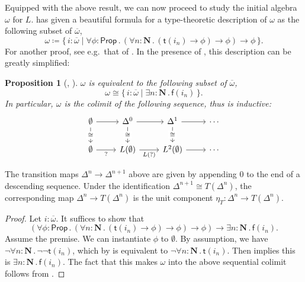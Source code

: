 \documentclass[a4paper,12pt]{amsart}
\newtheorem{proposition}[theorem]{Proposition}
\theoremstyle{definition}
\newcommand{\mb}[1]{\mathbf{#1}}
\newcommand{\ms}[1]{\mathsf{#1}}
\newcommand{\ov}[1]{\overline{#1}}
\newcommand{\scomp}[2]{\{\,#1\mid#2\,\}}
\newcommand{\prth}[1]{\left(#1\right)}
\newcommand{\N}{\mb N}
\newcommand{\fa}[2]{\forall #1\!\colon\!\!#2\mathpunct{.}}
\newcommand{\ex}[2]{\exists #1\!\colon\!\!#2\mathpunct{.}}
\newcommand{\emp}{\emptyset}
\newcommand{\pp}{\ms{Prop}}
\newcommand\istsym{\ms{t}}
\newcommand\isfsym{\ms{f}}
\newcommand\ist[1]{\istsym(#1)}
\newcommand\isf[1]{\isfsym(#1)}
\begin{document}
Equipped with the above result, we can now proceed to study the initial algebra $\omega$ for $L$. \citet{JIBLADZE1997185} has given a beautiful formula for a type-theoretic description of $\omega$ as the following subset of $\ov\omega$, 
\[ \omega \coloneq \scomp{i : \ov\omega}{\fa\phi{\pp} (\fa n{\N} (\ist{i_n} \to \phi) \to \phi) \to \phi}\text{.} \]
For another proof, see e.g.\ that of \citet{VANOOSTEN2000233}. In the presence of , this description can be greatly simplified:

\begin{proposition}[\AxiomNT, \AxiomSQCC]\label{prop:omegacolimit}
  $\omega$ is equivalent to the following subset of $\ov\omega$,
  \[ \omega \cong \scomp{i : \ov\omega}{\ex n{\N} \isf{i_n}}\text{.} \]
  In particular, $\omega$ is the colimit of the following sequence, thus is inductive:
  \[\begin{tikzcd}
    \emp & {\Delta^0} & {\Delta^1} & \cdots \\
    \emp & {L(\emp)} & {L^2(\emp)} & \cdots
    \arrow[from=1-1, to=1-2]
    \arrow["\cong"{description}, from=1-1, to=2-1]
    \arrow[from=1-2, to=1-3]
    \arrow["\cong"{description}, from=1-2, to=2-2]
    \arrow[from=1-3, to=1-4]
    \arrow["\cong"{description}, from=1-3, to=2-3]
    \arrow["{?}"', from=2-1, to=2-2]
    \arrow["{L(?)}"', from=2-2, to=2-3]
    \arrow[from=2-3, to=2-4]
  \end{tikzcd}\]
\end{proposition}

The transition maps $\Delta^n\to \Delta^{n+1}$ above are given by appending $0$ to the end of a descending sequence. Under the identification $\Delta^{n+1}\cong T(\Delta^n)$, the corresponding map $\Delta^n\to T(\Delta^n)$ is the unit component $\eta_T\colon \Delta^n\to T(\Delta^{n})$.

\begin{proof}
  Let $i : \ov\omega$. It suffices to show that
  \[ \prth{\fa\phi{\pp} (\fa n{\N} (\ist{i_n} \to \phi) \to \phi) \to \phi} \to \ex{n}\N \isf{i_n}\text{.} \]
  Assume the premise. We can instantiate $\phi$ to $\emp$. By assumption, we have $\neg\fa n\N \neg\neg\ist{i_n}$, which by  is equivalent to $\neg\fa n\N \ist{i_n}$. Then  implies this is $\ex n\N \isf{i_n}$. The fact that this makes $\omega$ into the above sequential colimit follows from \citet[Cor.~1.10]{VANOOSTEN2000233}.
\end{proof}
\end{document}
